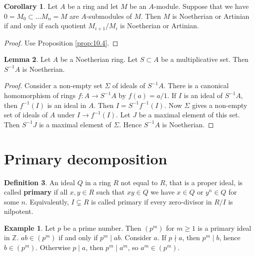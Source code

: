 \documentclass{article}
\newcommand{\Z}{\mathbb{Z}}
\newcommand{\rb}[1]{\left( #1 \right)}
\theoremstyle{definition}\newtheorem{definition}{Definition}[section]
\theoremstyle{definition}\newtheorem{remark}[definition]{Remark}
\theoremstyle{definition}\newtheorem*{example}{Example}
\theoremstyle{definition}\newtheorem*{note}{Note}
\newtheorem{lemma}[definition]{Lemma}
\newtheorem{corollary}[definition]{Corollary}
\begin{document}
\begin{corollary}
Let $ A $ be a ring and let $ M $ be an $ A $-module. Suppose that we have $ 0 = M_0 \subset \dots M_n = M $ are $ A $-submodules of $ M $. Then $ M $ is Noetherian or Artinian if and only if each quotient $ M_{i + 1} / M_i $ is Noetherian or Artinian.
\end{corollary}

\begin{proof}
Use Proposition \ref{prop:10.4}.
\end{proof}

\begin{lemma}
Let $ A $ be a Noetherian ring. Let $ S \subset A $ be a multiplicative set. Then $ S^{-1}A $ is Noetherian.
\end{lemma}

\begin{proof}
Consider a non-empty set $ \Sigma $ of ideals of $ S^{-1}A $. There is a canonical homomorphism of rings $ f : A \to S^{-1}A $ by $ f\rb{a} = a / 1 $. If $ I $ is an ideal of $ S^{-1}A $, then $ f^{-1}\rb{I} $ is an ideal in $ A $. Then $ I = S^{-1}f^{-1}\rb{I} $. Now $ \Sigma $ gives a non-empty set of ideals of $ A $ under $ I \to f^{-1}\rb{I} $. Let $ J $ be a maximal element of this set. Then $ S^{-1}J $ is a maximal element of $ \Sigma $. Hence $ S^{-1}A $ is Noetherian.
\end{proof}

\section{Primary decomposition}

\begin{definition}
An ideal $ Q $ in a ring $ R $ not equal to $ R $, that is a proper ideal, is called \textbf{primary} if all $ x, y \in R $ such that $ xy \in Q $ we have $ x \in Q $ or $ y^n \in Q $ for some $ n $. Equivalently, $ I \subsetneq R $ is called primary if every zero-divisor in $ R / I $ is nilpotent.
\end{definition}

\begin{example}
Let $ p $ be a prime number. Then $ \rb{p^m} $ for $ m \ge 1 $ is a primary ideal in $ \Z $. $ ab \in \rb{p^m} $ if and only if $ p^m \mid ab $. Consider $ a $. If $ p \nmid a $, then $ p^m \mid b $, hence $ b \in \rb{p^m} $. Otherwise $ p \mid a $, then $ p^m \mid a^m $, so $ a^m \in \rb{p^m} $.
\end{example}
\end{document}
